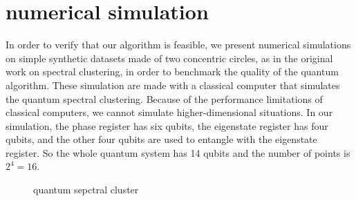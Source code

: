 \documentclass[onecolumn,notitlepage]{revtex4-1}
\begin{document}
\section{numerical simulation}
In order to verify that our algorithm is feasible, we present numerical simulations on simple synthetic datasets made of two concentric circles, as in the original work on spectral clustering, in order to benchmark the quality of the quantum algorithm. 
These simulation are made with a classical computer that simulates the quantum spectral clustering. Because of the performance limitations of classical computers, we cannot simulate higher-dimensional situations. In our simulation, the phase register has six qubits, the eigenstate register has four qubits, and the other four qubits are used to entangle with the eigenstate register. So the whole quantum system has 14 qubits and the number of points is $2^4=16$.
\begin{figure}[H]
    \centering 
    \caption{quantum sepctral cluster}
    \label{Fig.main}
\end{figure}
\end{document}
